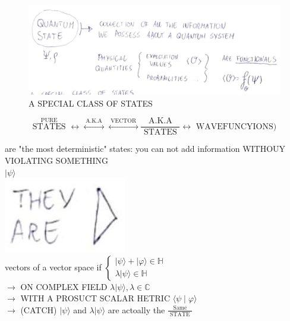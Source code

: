 \documentclass[10pt]{article}
\begin{document}
\begin{figure}[h]
\begin{center}
  \includegraphics[width=\textwidth]{2025_10_16_f02af6fa434c9f0bcc00g-03(2)}
\captionsetup{labelformat=empty}
\caption{A SPECIAL CLASS OF STATES}
\end{center}
\end{figure}

$$
\stackrel{\text { PURE }}{\text { STATES }} \longleftrightarrow \stackrel{\text { A.K.A }}{\longleftrightarrow} \stackrel{\text { VECTOR }}{\longleftrightarrow} \frac{\text { A.K.A }}{\text { STATES }} \longleftrightarrow \text { WAVEFUNCYIONS) }
$$

are "the most deterministic" states: you can not add information WITHOUY VIOLATING SOMETHING\\
$|\psi\rangle$\\
\includegraphics[max width=\textwidth, center]{2025_10_16_f02af6fa434c9f0bcc00g-03(1)}\\
vectors of a vector space if $\left\{\begin{array}{l}|\psi\rangle+|\varphi\rangle \in \mathbb{H} \\ \lambda|\psi\rangle \in \mathbb{H}\end{array}\right.$\\
$\rightarrow$ ON COMPLEX FIELD $\lambda|\psi\rangle, \lambda \in \mathbb{C}$\\
$\rightarrow$ WITH A PROSUCT SCALAR HETRIC $\langle\psi \mid \varphi\rangle$\\
$\rightarrow$ (CATCH) $|\psi\rangle$ and $\lambda|\psi\rangle$ are actoally the $\frac{\text { Same }}{\text { STATE }}$
\end{document}
